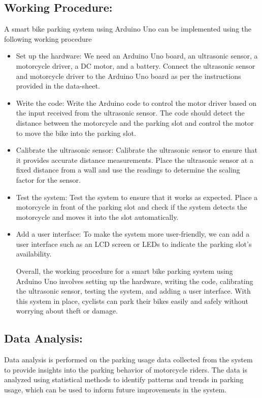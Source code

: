 \documentclass[conference]{IEEEtran}
\begin{document}
	\subsection {Working Procedure:}
	 A smart bike parking system using Arduino Uno can be implemented using the following working procedure
	\begin{itemize}
		\item Set up the hardware: We need an Arduino Uno board, an ultrasonic sensor, a motorcycle driver, a DC motor, and a battery. Connect the ultrasonic sensor and motorcycle driver to the Arduino Uno board as per the instructions provided in the data-sheet.
		\item Write the code: Write the Arduino code to control the motor driver based on the input received from the ultrasonic sensor. The code should detect the distance between the motorcycle and the parking slot and control the motor to move the bike into the parking slot.
		\item Calibrate the ultrasonic sensor: Calibrate the ultrasonic sensor to ensure that it provides accurate distance measurements. Place the ultrasonic sensor at a fixed distance from a wall and use the readings to determine the scaling factor for the sensor.
		\item Test the system: Test the system to ensure that it works as expected. Place a motorcycle in front of the parking slot and check if the system detects the motorcycle and moves it into the slot automatically.
		\item  Add a user interface: To make the system more user-friendly, we can add a user interface such as an LCD screen or LEDs to indicate the parking slot's availability.
		
			Overall, the working procedure for a smart bike parking system using Arduino Uno involves setting up the hardware, writing the code, calibrating the ultrasonic sensor, testing the system, and adding a user interface. With this system in place, cyclists can park their bikes easily and safely without worrying about theft or damage.

		\end{itemize}
	
	\subsection{Data Analysis:}
Data analysis is performed on the parking usage data collected from the system to provide insights into the parking behavior of motorcycle riders. The data is analyzed using statistical methods to identify patterns and trends in parking usage, which can be used to inform future improvements in the system.
\end{document}
